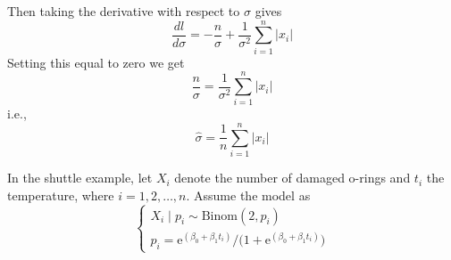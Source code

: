 \documentclass[12pt]{article}
\newenvironment{question}[2][Question]{\begin{trivlist}
\item[\hskip \labelsep {\bfseries #1}\hskip \labelsep {\bfseries #2.}]}{\end{trivlist}}
\begin{document}
\begin{enumerate}[(a)]
Then taking the derivative with respect to $\sigma$ gives
\begin{equation*}
\frac{dl}{d\sigma} = -\frac{n}{\sigma} + \frac{1}{\sigma^2}\sum_{i=1}^n|x_i|
\end{equation*}
Setting this equal to zero we get
\begin{equation*}
\frac{n}{\sigma} = \frac{1}{\sigma^2}\sum_{i=1}^n|x_i|
\end{equation*}
i.e., 
\begin{equation*}
\boxed{\hat \sigma = \frac{1}{n}\sum_{i=1}^n|x_i|}
\end{equation*}

\end{enumerate}
 

\bigskip
\bigskip

\begin{question}{4.2} 
 In the shuttle example, let $X_i$ denote the number of damaged o-rings and $t_i$
the temperature, where $i = 1, 2, \dots, n$. Assume the model as
$$
\begin{cases} 
       X_i \mid p_i \sim \text{Binom}(2, p_i) \\
       p_i = \mathrm{e}^{(\beta_0 + \beta_1 t_i)} /  ( 1 +  {\mathrm{e}^{(\beta_0 + \beta_1 t_i)})}
\end{cases}
$$
\end{question}
\end{document}
